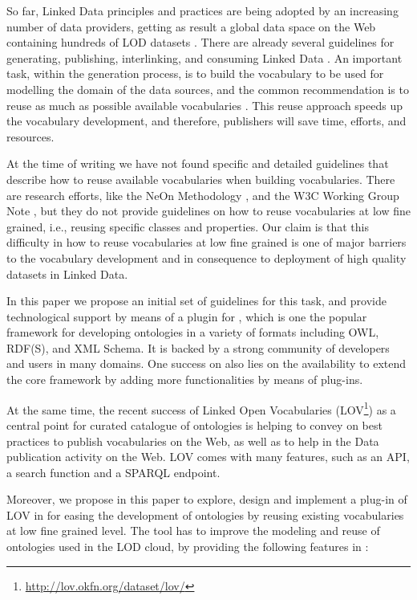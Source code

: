 So far, Linked Data principles and practices are being adopted by an increasing number of data providers, getting as result a global data space on the Web containing hundreds of LOD datasets \cite{Heath_Bizer_2011}. There are already several guidelines for generating, publishing, interlinking, and consuming Linked Data \cite{}. An important task, within the generation process, is to build the vocabulary to be used for modelling the domain of the data sources, and the common recommendation is to reuse as much as possible available vocabularies \cite{}. This reuse approach speeds up the vocabulary development, and therefore, publishers will save time, efforts, and resources. 

At the time of writing we have not found specific and detailed guidelines that describe how to reuse available vocabularies when building vocabularies. There are research efforts, like the NeOn Methodology \cite{}, and the W3C Working Group Note \cite{}, but they do not provide guidelines on how to reuse vocabularies at low fine grained, i.e., reusing specific classes and properties. Our claim is that this difficulty in how to reuse vocabularies at low fine grained is one of major barriers to the vocabulary development and in consequence to deployment of high quality datasets in Linked Data.

In this paper we propose an initial set of guidelines for this task, and provide technological support by means of a plugin for \protege, which is one the popular framework for developing ontologies in a variety of formats including OWL, RDF(S), and XML Schema. It is backed by a strong community of developers and users in many domains. One success on \protege also lies on the availability to extend the core framework by adding more functionalities by means of plug-ins.

At the same time, the recent success of Linked Open Vocabularies (LOV\footnote{\url{http://lov.okfn.org/dataset/lov/}}) as a central point for curated catalogue of ontologies is helping to convey on best practices to publish vocabularies on the Web, as well as to help in the Data publication activity on the Web. LOV comes with many features, such as an API, a search function and a SPARQL endpoint.
 
Moreover, we propose in this paper to explore, design and implement a plug-in of LOV in \protege for easing the development of ontologies by reusing existing vocabularies at low fine grained level. The tool has to improve the modeling and reuse of ontologies used in the LOD cloud, by providing the following features in \protege:

